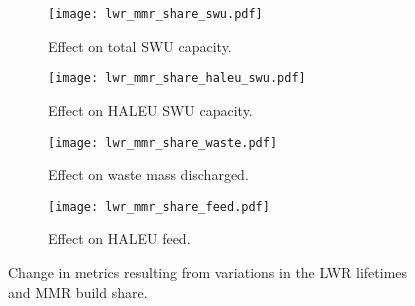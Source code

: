 \begin{figure}
    \ContinuedFloat    
    \begin{subfigure}[b]{0.48\textwidth}
        \centering
        \texttt{[image: lwr\_mmr\_share\_swu.pdf]}
        \caption{Effect on total SWU capacity.}
        \label{fig:lwr_mmr_share_swu}
    \end{subfigure}
    \hfill
    \begin{subfigure}[b]{0.48\textwidth}
        \centering
        \texttt{[image: lwr\_mmr\_share\_haleu\_swu.pdf]}
        \caption{Effect on HALEU SWU capacity.}
        \label{fig:lwr_mmr_share_haleu_swu}
    \end{subfigure}

    \begin{subfigure}[b]{0.48\textwidth}
        \centering
        \texttt{[image: lwr\_mmr\_share\_waste.pdf]}
        \caption{Effect on waste mass discharged.}
        \label{fig:lwr_mmr_share_waste}
    \end{subfigure}
    \hfill
    \begin{subfigure}[b]{0.48\textwidth}
        \centering
        \texttt{[image: lwr\_mmr\_share\_feed.pdf]}
        \caption{Effect on HALEU feed.}
        \label{fig:lwr_mmr_share_feed}
    \end{subfigure}
    \caption{Change in metrics resulting from variations in the 
    LWR lifetimes and MMR build share.}
    \label{fig:lwr_mmr_share}
\end{figure}

